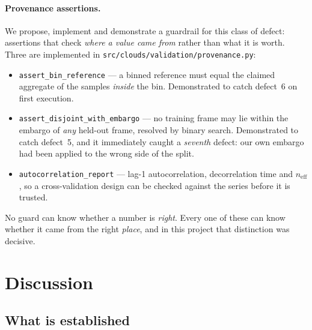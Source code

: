 \documentclass[11pt,a4paper]{article}
\newcommand{\neff}{\ensuremath{n_{\mathrm{eff}}}}
\begin{document}
\paragraph{Provenance assertions.} We propose, implement and demonstrate a guardrail for this
class of defect: assertions that check \emph{where a value came from} rather than what it is
worth. Three are implemented in \texttt{src/clouds/validation/provenance.py}:

\begin{itemize}
\item \texttt{assert\_bin\_reference} --- a binned reference must equal the claimed aggregate
of the samples \emph{inside} the bin. Demonstrated to catch defect~6 on first execution.
\item \texttt{assert\_disjoint\_with\_embargo} --- no training frame may lie within the embargo
of \emph{any} held-out frame, resolved by binary search. Demonstrated to catch defect~5, and
it immediately caught a \emph{seventh} defect: our own embargo had been applied to the wrong
side of the split.
\item \texttt{autocorrelation\_report} --- lag-1 autocorrelation, decorrelation time and
$\neff$, so a cross-validation design can be checked against the series before it is trusted.
\end{itemize}

No guard can know whether a number is \emph{right}. Every one of these can know whether it came
from the right \emph{place}, and in this project that distinction was decisive.

\section{Discussion}
\label{sec:discussion}

\subsection{What is established}
\end{document}
